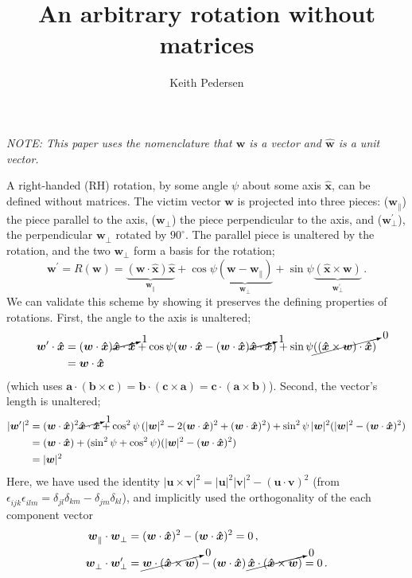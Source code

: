 \documentclass{article}
\renewcommand{\vec}[1]{\boldsymbol{#1}}
\newcommand{\vecN}[1]{\vec{\hat{#1}}}
\newcommand{\ds}{^{}}
\newcommand{\abs}[1]{|#1|}
\newcommand{\ang}{\psi}
\newcommand{\vict}{\vec{w}}
\newcommand{\ax}{\vecN{x}}
\begin{document}
\title{An arbitrary rotation without matrices}
\author{Keith Pedersen}

\maketitle

{\it NOTE: This paper uses the nomenclature that $\vec{w}$ is a vector and 
$\vecN{w}$ is a unit vector.}
\medskip

A right-handed (RH) rotation, by some angle $\ang$ about some axis $\ax$, 
can be defined without matrices. The victim vector $\vec{w}$ is projected into three pieces:
($\vec{w}_\parallel\ds$) the piece parallel to the axis, 
($\vec{w}_{\bot}\ds$) the piece perpendicular to the axis, 
and ($\vec{w}^\prime_{\bot}$), the perpendicular $\vec{w}_{\bot}\ds$ rotated by $90^\circ$.
The parallel piece is unaltered by the rotation, 
and the two $\vec{w}_{\bot}\ds$ form a basis for the rotation;
\begin{equation}\label{eq:rot}
	\vict^\prime=R(\vict) = \underset{\vec{w}_\parallel\ds}{\underbrace{(\vict\cdot\ax)\ax}} 
		+ \cos\ang\underset{\vec{w}_{\bot}\ds}{\underbrace{(\vict - \vec{w}_\parallel\ds)}}
		+ \sin\ang\underset{\vec{w}^\prime_{\bot}}{\underbrace{(\ax\times\vict)}}
		\,.
\end{equation}
We can validate this scheme by showing it preserves %
the defining properties of rotations. 
First, the angle to the axis is unaltered;
\begin{align}
	\vict^\prime \cdot\ax
	& = (\vict\cdot\ax)\cancelto{1}{\ax\cdot\ax}
	  + \cos\ang(\vict\cdot\ax - (\vict\cdot\ax)\cancelto{1}{\ax\cdot\ax})	
	  + \sin\ang\cancelto{0}{((\ax\times\vict)\cdot\ax)}		\nonumber\\
	& = \vict\cdot\ax
\end{align}
(which uses $\vec{a}\cdot(\vec{b}\times\vec{c}) 
	= \vec{b}\cdot(\vec{c}\times\vec{a}) 
	= \vec{c}\cdot(\vec{a}\times\vec{b})$).
Second, the vector's length is unaltered;
\begin{align}
	\abs{\vict^\prime}^2 
	& = (\vict\cdot\ax)^2\cancelto{1}{\ax\cdot\ax}
	 + \cos^2\ang\,(\abs{\vict}^2 - 2(\vict\cdot\ax)^2 + (\vict\cdot\ax)^2)
	  + \sin^2\ang\,\abs{\vict}^2(\abs{\vict}^2 - (\vict\cdot\vecN{x})^2)	\nonumber\\
	  & = (\vict\cdot\ax) + (\sin^2\ang + \cos^2\ang)(\abs{\vict}^2 - (\vict\cdot\ax)^2)	\nonumber\\
	  & = \abs{\vict}^2
\end{align}
Here, we have used the identity 
$\abs{\vec{u}\times\vec{v}}^2=\abs{\vec{u}}^2\abs{\vec{v}}^2 - (\vec{u}\cdot\vec{v})^2$
(from $\epsilon_{ijk}\ds\epsilon_{ilm}\ds=\delta_{jl}\ds\delta_{km}\ds-\delta_{jm}\ds\delta_{kl}\ds$), 
and implicitly used the orthogonality of the each component vector
\begin{align}
	\vec{w}_\parallel\ds \cdot \vec{w}_\bot\ds
		& =(\vict\cdot\ax)^2 - (\vict\cdot\ax)^2 = 0
	\,,\\
	\vec{w}_\bot\ds \cdot \vec{w}^\prime_\bot
		& = \cancelto{0}{\vec{w}\cdot(\ax\times\vec{w})} 
			- (\vict\cdot\ax)\,\cancelto{0}{\ax\cdot(\ax\times\vec{w})} = 0
	\,.
\end{align}
\end{document}
